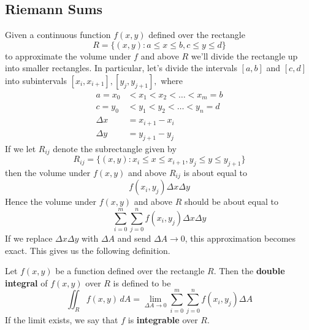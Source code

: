 \documentclass[10pt,]{book}
\newcommand{\terminology}[1]{\textbf{#1}}
\theoremstyle{ptxplainnotitle}
\theoremstyle{ptxplaintitle}
\theoremstyle{ptxplainnotitle}
\theoremstyle{ptxplaintitle}
\theoremstyle{ptxplainnotitle}
\theoremstyle{ptxplaintitle}
\theoremstyle{ptxdefinitionnotitle}
\theoremstyle{ptxdefinitiontitle}
\theoremstyle{ptxdefinitionnotitle}
\theoremstyle{ptxdefinitiontitle}
\theoremstyle{ptxdefinitionnotitle}
\theoremstyle{ptxdefinitiontitle}
\theoremstyle{ptxdefinitionnotitle}
\theoremstyle{ptxdefinitiontitle}
\theoremstyle{ptxdefinitionnotitle}
\theoremstyle{ptxdefinitiontitle}
\numberwithin{equation}{section}
\begin{document}
\subsection[{Riemann Sums}]{Riemann Sums}\label{subsection-riemann-sums}
\hypertarget{p-1115}{}%
Given a continuous function \(f(x,y)\) defined over the rectangle%
\begin{equation*}
R = \{(x,y) : a\leq x\leq b, c\leq y\leq d\}
\end{equation*}
to approximate the volume under \(f\) and above \(R\) we'll divide the rectangle up into smaller rectangles. In particular, let's divide the intervals \([a,b]\) and \([c,d]\) into subintervals \([x_{i},x_{i+1}], [y_{j},y_{j+1}],\) where%
\begin{align*}
a = x_{0} & < x_{1} < x_{2} < \dots < x_{m} = b \\
c = y_{0} & < y_{1} < y_{2} < \dots < y_{n} = d \\
\Delta x & = x_{i+1} - x_{i} \\
\Delta y & = y_{j+1} - y_{j} 
\end{align*}
If we let \(R_{ij}\) denote the subrectangle given by%
\begin{equation*}
R_{ij} = \{(x,y) : x_{i}\leq x\leq x_{i+1}, y_{j}\leq y\leq y_{j+1}\}
\end{equation*}
then the volume under \(f(x,y)\) and above \(R_{ij}\) is about equal to%
\begin{equation*}
f(x_{i},y_{j})\Delta x\Delta y
\end{equation*}
Hence the volume under \(f(x,y)\) and above \(R\) should be about equal to%
\begin{equation*}
\sum_{i=0}^{m}\sum_{j=0}^{n}f(x_{i},y_{j})\Delta x\Delta y
\end{equation*}
If we replace \(\Delta x\Delta y\) with \(\Delta A\) and send \(\Delta A\to0\), this approximation becomes exact. This gives us the following definition.%
\begin{definition}\label{definition-double-integral-over-a-rectangle}
\hypertarget{p-1116}{}%
Let \(f(x,y)\) be a function defined over the rectangle \(R\). Then the \terminology{double integral} of \(f(x,y)\) over \(R\) is defined to be%
\begin{equation*}
\iint_{R}f(x,y)\,dA = \lim_{\Delta A\to0}\sum_{i=0}^{m}\sum_{j=0}^{n}f(x_{i},y_{j})\Delta A
\end{equation*}
If the limit exists, we say that \(f\) is \terminology{integrable} over \(R\).%
\end{definition}
\end{document}
